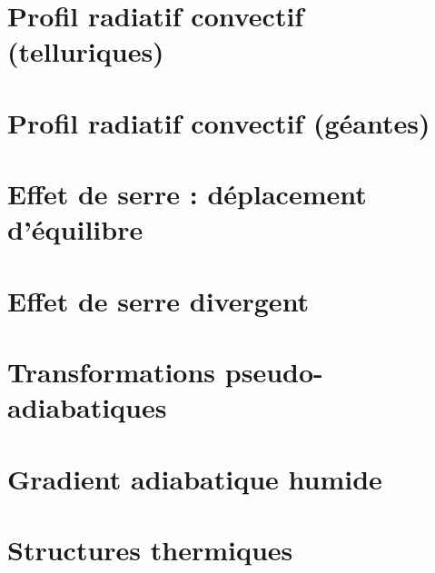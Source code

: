 \documentclass[a4paper,DIV16,10pt]{scrartcl}
\begin{document}
 \inidoc

\newpage
\section{Profil radiatif convectif (telluriques)}


\newpage
\section{Profil radiatif convectif (géantes)}


\newpage
\section{Effet de serre : déplacement d'équilibre}


\newpage
\section{Effet de serre divergent}


\newpage
\section{Transformations pseudo-adiabatiques}


\newpage
\section{Gradient adiabatique humide}


\newpage
\section{Structures thermiques}


%
%
%
%
%
%
\end{document}
